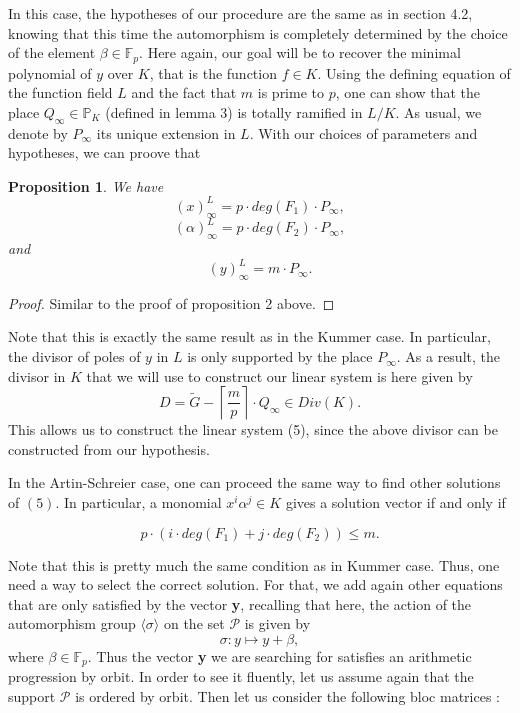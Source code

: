 \documentclass[10pt]{article}
\newtheorem{prop1}{Proposition}[]
\newcommand{\s}{\vspace{0.3cm}}
\newcommand{\cd}{\cdot}
\newcommand{\PR}{\mathcal{P}}
\begin{document}
\s

In this case, the hypotheses of our procedure are the same as in section 4.2, knowing that this time the automorphism is completely determined by the choice of the element $\beta \in \mathbb{F}_p$. Here again, our goal will be to recover the minimal polynomial of $y$ over $K$, that is the function $f \in K$. Using the defining equation of the function field $L$ and the fact that $m$ is prime to $p$, one can show that the place $Q_{\infty} \in \mathbb{P}_K$ (defined in lemma 3) is totally ramified in $L/K$. As usual, we denote by $P_{\infty}$ its unique extension in $L$. With our choices of parameters and hypotheses, we can proove that

\s

\begin{prop1}
We have
\[(x)^L_{\infty} = p \cd deg(F_1) \cd P_{\infty},\]
\[(\alpha)^L_{\infty} = p \cd deg(F_2) \cd P_{\infty},\]
and
\[(y)^L_{\infty} = m \cd P_{\infty}.\]
\end{prop1}

\s

\begin{proof}
Similar to the proof of proposition 2 above.
\end{proof}

\s

Note that this is exactly the same result as in the Kummer case. In particular, the divisor of poles of $y$ in $L$ is only supported by the place $P_{\infty}$. As a result, the divisor in $K$ that we will use to construct our linear system is here given by 
\[D = \tilde{G} - \left\lceil\frac{m}{p}\right\rceil \cd Q_{\infty} \in Div(K).\]
This allows us to construct the linear system (5), since the above divisor can be constructed from our hypothesis. 


\newpage

In the Artin-Schreier case, one can proceed the same way to find other solutions of $(5)$. In particular, a monomial $x^i\alpha^j \in K$ gives a solution vector if and only if 

\[p \cd (i \cd deg(F_1)+j \cd deg(F_2)) \leq m.\]

Note that this is pretty much the same condition as in Kummer case. Thus, one need a way to select the correct solution. For that, we add again other equations that are only satisfied by the vector \textbf{y}, recalling that here, the action of the automorphism group $\langle\sigma\rangle$ on the set $\PR$ is given by 
\[\sigma : y \longmapsto y + \beta,\]
where $\beta \in \mathbb{F}_p$. Thus the vector \textbf{y} we are searching for satisfies an arithmetic progression by orbit. In order to see it fluently, let us assume again that the support $\PR$ is ordered by orbit. Then let us consider the following bloc matrices :
\end{document}
